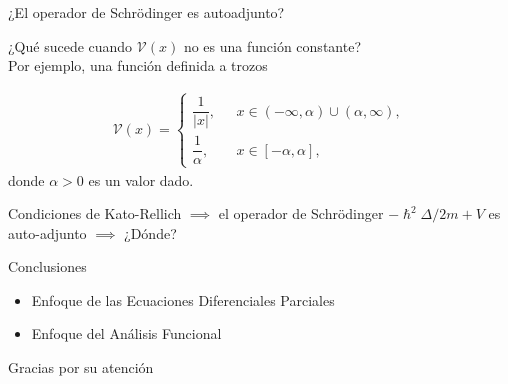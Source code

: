\documentclass[aspectratio=1610]{beamer}
\newcommand*{\field}[1]{\mathbb{#1}}
\newtheorem*{teo}{Teorema}
\begin{document}
\begin{frame}{¿El operador de Schrödinger es autoadjunto?}

¿Qué sucede cuando $\mathcal{V}(x)$ no es una función constante? \\
\vspace{0.04\textheight}
Por ejemplo, una función definida a trozos

\begin{align*}
        \mathcal{V}(x) = 
        \left\{ \begin{array}{ll}
        \dfrac{1}{|x|},& \:\:\:  x \in (-\infty,\alpha)\cup (\alpha,\infty),
        \\
        \dfrac{1}{\alpha},& \:\:\: x \in [-\alpha,\alpha],
        \end{array}
        \right.
    \end{align*}
donde $\alpha>0$ es un valor dado.

\vspace{0.04\textheight}

Condiciones de Kato-Rellich $\implies$ el operador de Schrödinger $-\hslash^2 \Delta/2m + V$ es auto-adjunto $\implies$ ¿Dónde?

\vspace{0.04\textheight}
\end{frame}

\begin{frame}{Conclusiones}

\begin{itemize}
    \item 
    \LARGE{\textcolor{Ocean}{Enfoque de las Ecuaciones Diferenciales Parciales}
    \vspace{0.2\textheight}}
    \item \LARGE{\textcolor{Ocean}{Enfoque del Análisis Funcional}} 
\end{itemize}

\end{frame}

\begin{frame}{}
    \Huge{\centerline{Gracias por su atención}}
\end{frame}
\end{document}
